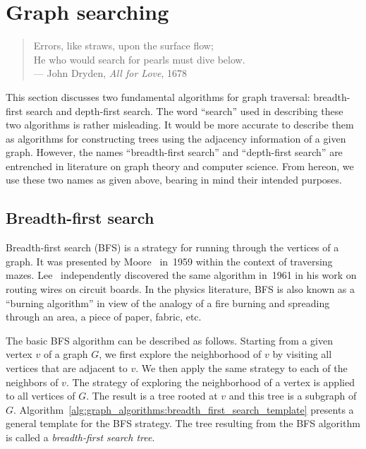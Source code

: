 
\section{Graph searching}
\label{sec:graph_algorithms:graph_searching}

\begin{quote}
\footnotesize
Errors, like straws, upon the surface flow; \\
He who would search for pearls must dive below. \\
\noindent
--- John Dryden, \emph{All for Love}, 1678
\end{quote}

\noindent
This section discusses two fundamental algorithms for graph
traversal: breadth-first
search and depth-first
search. The word ``search'' used in
describing these two algorithms is rather misleading. It would be more
accurate to describe them as algorithms for constructing trees using
the adjacency information of a given graph. However, the names
``breadth-first search'' and ``depth-first search'' are entrenched in
literature on graph theory and computer science. From hereon, we use
these two names as given above, bearing in mind their intended
purposes.



\subsection{Breadth-first search}
\label{subsec:graph_algorithms:breadth_first_search}

Breadth-first search (BFS) is a
strategy for running through the vertices of a graph. It was presented
by Moore~\cite{Moore1959} in~1959 within the
context of traversing mazes.
Lee~\cite{Lee1961} independently discovered the same
algorithm in~1961 in his work on routing wires on circuit
boards. In the physics literature, BFS is also
known as a ``burning algorithm'' in view of the analogy of a fire
burning and spreading through an area, a piece of paper, fabric, etc.

The basic BFS algorithm can be described as
follows. Starting from a given vertex $v$ of a graph $G$, we first
explore the neighborhood of $v$ by visiting all vertices that are
adjacent to $v$. We then apply the same strategy to each of the
neighbors of $v$. The strategy of exploring the neighborhood of a
vertex is applied to all vertices of $G$. The result is a
tree rooted at $v$ and this tree is a
subgraph of $G$.
Algorithm~\ref{alg:graph_algorithms:breadth_first_search_template}
presents a general template for the BFS strategy. The tree
resulting from the BFS algorithm is called a
\emph{breadth-first search tree}.

